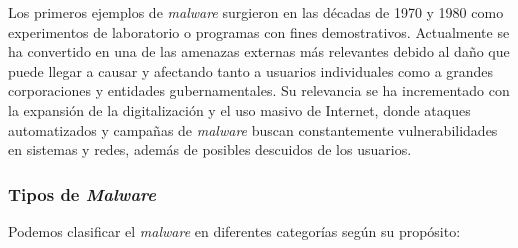 \vspace{1em}

Los primeros ejemplos de \textit{malware} surgieron en las décadas de 1970 y 1980 como experimentos de laboratorio o programas con fines demostrativos. Actualmente se ha convertido en una de las amenazas externas más relevantes debido al daño que puede llegar a causar y afectando tanto a usuarios individuales como a grandes corporaciones y entidades gubernamentales. Su relevancia se ha incrementado con la expansión de la digitalización y el uso masivo de Internet, donde ataques automatizados y campañas de \textit{malware} buscan constantemente vulnerabilidades en sistemas y redes, además de posibles descuidos de los usuarios.

\subsubsection{Tipos de \textit{Malware}}
\label{subsubsec:tipos_malware}

Podemos clasificar el \textit{malware} en diferentes categorías \cite{categoriamw} según su propósito:


